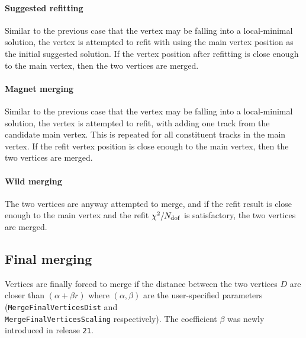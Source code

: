 \documentclass[NOTE, atlasdraft=true, texlive=2018, UKenglish]{\ATLASLATEXPATH atlasdoc}
\begin{document}
\paragraph{Suggested refitting}
Similar to the previous case that the vertex may be falling into a local-minimal solution, the vertex is attempted to refit with using the main vertex position as the initial suggested solution. If the vertex position after refitting is close enough to the main vertex, then the two vertices are merged.

\paragraph{Magnet merging}
Similar to the previous case that the vertex may be falling into a local-minimal solution, the vertex is attempted to refit, with adding one track from the candidate main vertex. This is repeated for all constituent tracks in the main vertex. If the refit vertex position is close enough to the main vertex, then the two vertices are merged.

\paragraph{Wild merging}
The two vertices are anyway attempted to merge, and if the refit result is close enough to the main vertex and the refit $\chi^{2}/N_{\rm dof}$ is satisfactory, the two vertices are merged.



\subsection{Final merging}
Vertices are finally forced to merge if the distance between the two vertices $D$ are closer than $(\alpha + \beta r)$ where $(\alpha,\beta)$ are the user-specified parameters ({\tt MergeFinalVerticesDist} and \\{\tt MergeFinalVerticesScaling} respectively). The coefficient $\beta$ was newly introduced in release {\tt 21}.
\end{document}
